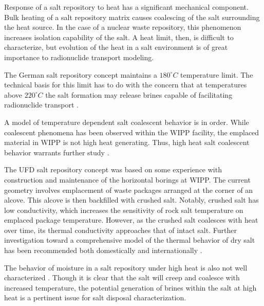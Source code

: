 \documentclass[letterpaper]{article}
\begin{document}
Response of a salt repository to heat has a significant
mechanical component. Bulk heating of a salt repository matrix causes
coalescing  of the salt surrounding the heat source. In the case of a nuclear
waste repository, this phenomenon increases isolation capability of the salt. A
heat limit, then, is difficult to characterize, but evolution of the heat in a
salt environment is of great importance to radionuclide transport modeling. 

The German salt repository concept maintains a $180^\circ C$ temperature limit. 
The technical basis for this limit has to do with the concern that at
temperatures above $220^\circ C$ the salt formation may release brines capable 
of facilitating radionuclide transport 
\cite{von_lensa_red-impact_2008, brewitz_long-term_2002}.

A model of temperature dependent salt coalescent behavior is in order. While 
coalescent phenomena has been observed within the \gls{WIPP} facility, the 
emplaced material in \gls{WIPP} is not high heat generating. Thus, high heat 
salt coalescent behavior warrants further study \cite{carter_disposal_2011}.

The \gls{UFD} salt repository concept was based on some experience with 
construction and maintenance of the horizontal borings at WIPP. The 
current geometry involves emplacement of waste packages arranged at the corner 
of an alcove. This alcove is then backfilled with crushed salt. Notably, crushed 
salt 
has low conductivity, which increases the sensitivity of rock salt temperature 
on emplaced package temperature. However, as the crushed salt coalesces with 
heat over time, its thermal conductivity approaches that of intact salt. Further 
investigation toward a comprehensive model of the thermal behavior of dry salt 
has been recommended both domestically and internationally 
\cite{carter_disposal_2011}. 

The behavior of moisture in a salt repository under high heat is also not well 
characterized . Though it is clear that the salt will creep and coalesce with 
increased temperature, the potential generation of brines within the salt at 
high heat is a pertinent issue for salt disposal characterization. 





\pagebreak


\end{document}
